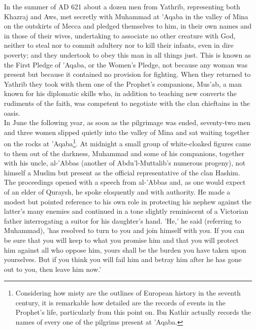\documentclass[10pt, twoside]{book}
\begin{document}
In the summer of AD 621 about a dozen men from Yathrib, representing both Khazraj and Aws, met 
secretly with Muhammad at 'Aqaba in the valley of Mina on the outskirts of Mecca and pledged 
themselves to him, in their own names and in those of their wives, undertaking to associate no other 
creature with God, neither to steal nor to commit adultery nor to kill their infants, even in dire 
poverty; and they undertook to obey this man in all things just. This is known as the First Pledge of 
'Aqaba, or the Women's Pledge, not because any woman was present but because it contained no 
provision for fighting. When they returned to Yathrib they took with them one of the Prophet's 
companions, Mus'ab, a man known for his diplomatic skills who, in addition to teaching new converts 
the rudiments of the faith, was competent to negotiate with the clan chieftains in the oasis. \\

In June the following year, as soon as the pilgrimage was ended, seventy-two men and three women 
slipped quietly into the valley of Mina and sat waiting together on the rocks at 'Aqaba\footnote{Considering how misty are the outlines of European history in the seventh century, it is remarkable how detailed are the records of events in the Prophet's life, particularly from this point on. Ibn Kathir actually records the names of every one of the pilgrims present at 'Aqaba.}. At midnight a small group of white\hyp{}cloaked figures came to them out of the darkness, Muhammad and some of his companions, together with his uncle, al\hyp{}'Abbas (another of Abdu'l\hyp{}Muttalib's numerous progeny), not himself a Muslim but present as the official representative of the clan Hashim. The proceedings opened with a speech from al\hyp{}'Abbas and, as one would expect of an elder of Quraysh, he spoke eloquently and with authority. He made a modest but pointed reference to his own role in protecting his nephew against the latter's many enemies and continued in a tone slightly reminiscent of a Victorian father interrogating a suitor for his daughter's hand. 'He,' he said (referring to Muhammad), 'has resolved to turn to you and join himself with you. If you can be sure that you will keep to what you promise him and that you will protect him against all who oppose him, yours shall be the burden you have taken upon yourselves. But if you think you will fail him and betray him after he has gone out to you, then leave him now.' \\
\end{document}
